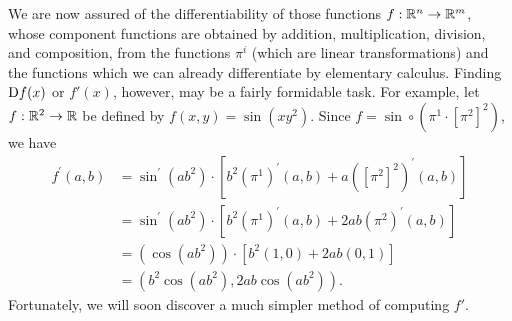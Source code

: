 We are now assured of the differentiability of those functions
$f:\mathbb{R}^n \to \mathbb{R}^m$, whose component functions are obtained by
addition, multiplication, division, and composition, from the
functions $\pi^i$ (which are linear transformations) and the functions 
which we can already differentiate by elementary calculus.
Finding $\mathrm{D}f(x)$ or $f'(x)$, however, may be a fairly
formidable task. For example, let $f:\mathbb{R}^2 \to \mathbb{R}$ be defined by 
$f(x, y) = \sin(xy^2)$. Since $f=\sin\circ \left(\pi^1\cdot \left[\pi^2\right]^2\right)$,
we have 
\begin{align*}
    f^{\prime}(a{,}b)
    & = \sin^{\prime}(ab^{2})\cdot[b^{2}(\pi^{1})^{\prime}(a,b)+a([\pi^{2}]^{2})^{\prime}(a,b)]  \\
    & = \sin^{\prime}(ab^{2})\cdot[b^{2}(\pi^{1})^{\prime}(a,b)+2ab(\pi^{2})^{\prime}(a,b)] \\
    & = (\cos(ab^{2}))\cdot[b^{2}(1,0)+2ab(0,1)] \\
    & = (b^{2}\cos(ab^{2}),2ab\cos(ab^{2})).
\end{align*}
Fortunately, we will soon discover a much simpler method of computing $f'$.

